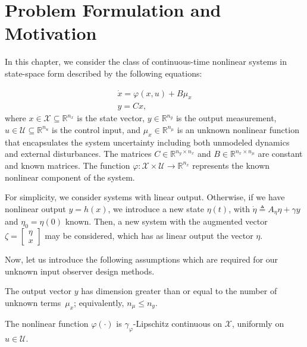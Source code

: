 \section{Problem Formulation and Motivation}\label{sec2}
%
In this chapter, we consider the class of continuous-time nonlinear systems in state-space form described by the following equations:

\begin{equation}\label{sys_1}
    \begin{array}{l}
        \dot{x} = \varphi(x,u) + B\mu_{x}  \\
        y = Cx, 
    \end{array}
\end{equation}
where $x\in \mathcal{X} \subseteq\mathbb{R}^{n_x}$ is the state vector, $y\in\mathbb{R}^{n_y}$ is the output measurement, $u\in\mathcal{U} \subseteq\mathbb{R}^{n_u}$ is the control input, and $\mu_{x}\in\mathbb{R}^{n_{\mu}}$ is an unknown nonlinear function that encapsulates the system uncertainty including both unmodeled dynamics and external disturbances. The matrices $C\in\mathbb{R}^{n_y \times n_x}$ and $B\in\mathbb{R}^{n_x \times n_{\mu}}$ are constant and known matrices. The function $\varphi: \mathcal{X} \times \mathcal{U} \to \mathbb{R}^{n_x}$ represents the known nonlinear component of the system. 

\begin{remark}
For simplicity, we consider systems with linear output. Otherwise, if we have nonlinear output $y = h(x)$, we introduce a new state $\eta(t)$, with $\dot{\eta} \triangleq A_{\eta} \eta + \gamma y$ and $\eta_0 = \eta(0)$ known. Then, a new system with the augmented vector $\zeta = \begin{bmatrix} \eta \\ x \end{bmatrix}$ may be considered, which has as linear output the vector $\eta$.
\end{remark}


Now, let us introduce the following assumptions which are required for our unknown input observer design methods.
\begin{assumption}\label{ali_hyp1}
The output vector $y$ has dimension greater than or equal to the number of unknown terms~$\mu_{x}$; equivalently, $n_{\mu} \leq n_y$.
\end{assumption}

\begin{assumption}\label{ali_hyp2}
The nonlinear function $\varphi(\cdot)$ is $\gamma_{\varphi}$-Lipschitz continuous on $\mathcal{X}$, uniformly on $u\in\mathcal{U}$.
\end{assumption}

